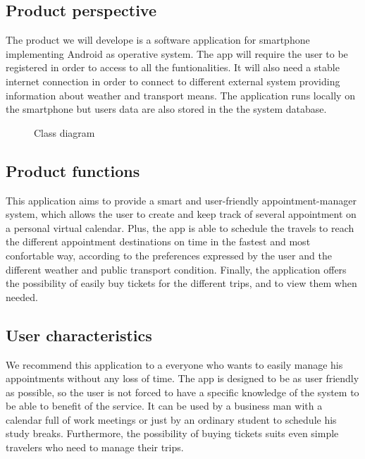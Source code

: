\subsection{Product perspective} 
The product we will develope is a software application  for smartphone implementing Android as operative system. The app will require the user to be registered in order to access to all the funtionalities. It will also need a stable internet connection in order to connect to different external system providing information about weather and transport means. The application runs locally on the smartphone but users data are also stored in the the system database.

\begin{figure}[!h]
	\centering
	\caption{Class diagram}
\end{figure}

\subsection{Product functions}
This application aims to provide a smart and user-friendly appointment-manager system, which allows the user to create and keep track of several appointment on a personal virtual calendar. Plus, the app is able to schedule the travels to reach the different appointment destinations on time in the fastest and most confortable way, according to the preferences expressed by the user and the different weather and public transport condition. Finally, the application offers the possibility of easily buy tickets for the different trips, and to view them when needed.
\subsection{User characteristics}
We recommend this application to a everyone who wants to easily manage his appointments without any loss of time. The app is designed to be as user friendly as possible, so the user is not forced to have a specific knowledge of the system to be able to benefit of the service. It can be used by a business man with a calendar full of work meetings or just by an ordinary student to schedule his study breaks. Furthermore, the possibility of buying tickets suits even simple travelers who need to manage their trips.
